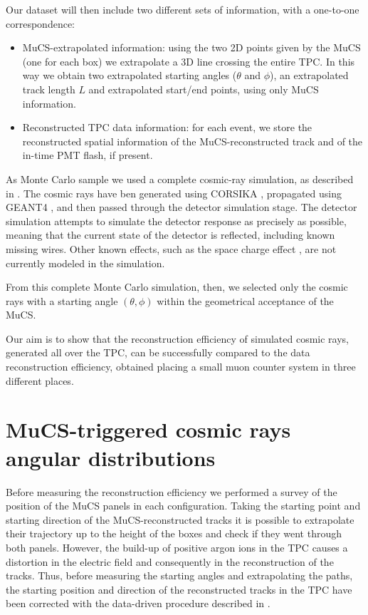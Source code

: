\documentclass[a4paper]{scrartcl}
\begin{document}
Our dataset will then include two different sets of information, with a one-to-one correspondence:
\begin{itemize}
  \item MuCS-extrapolated information: using the two 2D points given by the MuCS (one for each box) we extrapolate a 3D line crossing the entire TPC. In this way we obtain two extrapolated starting angles ($\theta$ and $\phi$), an extrapolated track length $L$ and extrapolated start/end points, using only MuCS information.
  \item Reconstructed TPC data information: for each event, we store the reconstructed spatial information of the MuCS-reconstructed track and of the in-time PMT flash, if present.
\end{itemize}


As Monte Carlo sample we used a complete cosmic-ray simulation, as described in \cite{cosmic}. The cosmic rays have ben generated using CORSIKA \cite{corsika},  propagated using GEANT4 \cite{geant}, and then passed through the detector simulation stage. The detector simulation attempts to simulate the detector response as precisely as possible, meaning that the current state of the detector is reflected, including known missing wires. Other known effects, such as the space charge effect \cite{sce}, are not currently modeled in the simulation.

From this complete Monte Carlo simulation, then, we selected only the cosmic rays with a starting angle $(\theta,\phi)$ within the geometrical acceptance of the MuCS.

Our aim is to show that the reconstruction efficiency of simulated cosmic rays, generated all over the TPC, can be successfully compared to the data reconstruction efficiency, obtained placing a small muon counter system in three different places.

\section{MuCS-triggered cosmic rays angular distributions}\label{sec:flux}
Before measuring the reconstruction efficiency we performed a survey of the position of the MuCS panels in each configuration. Taking the starting point and starting direction of the MuCS-reconstructed tracks it is possible to extrapolate their trajectory up to the height of the boxes and check if they went through both panels. However, the build-up of positive argon ions in the TPC causes a distortion in the electric field and consequently in the reconstruction of the tracks. Thus, before measuring the starting angles and extrapolating the paths, the starting position and direction of the reconstructed tracks in the TPC have been corrected with the data-driven procedure described in \cite{sce}.
\end{document}
